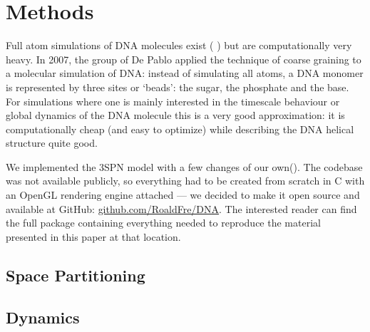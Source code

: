 \section{Methods}

Full atom simulations of DNA molecules exist ( ) but are computationally very heavy. In 2007, the group of De Pablo \cite{knotts2007coarse} applied the technique of coarse graining to a molecular simulation of DNA: instead of simulating all atoms, a DNA monomer is represented by three sites or `beads': the sugar, the phosphate and the base. For simulations where one is mainly interested in the timescale behaviour or global dynamics of the DNA molecule this is a very good approximation: it is computationally cheap (and easy to optimize) while describing the DNA helical structure quite good. 

We implemented the 3SPN model with a few changes of our own(). The codebase was not available publicly, so everything had to be created from scratch in C with an OpenGL rendering engine attached --- we decided to make it open source and available at GitHub: \href{https://github.com/RoaldFre/DNA}{github.com/RoaldFre/DNA}. The interested reader can find the full package containing everything needed to reproduce the material presented in this paper at that location.









\subsection{Space Partitioning}




\subsection{Dynamics}
